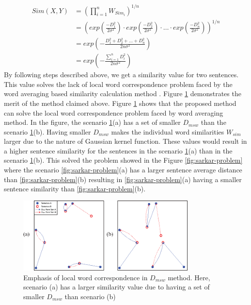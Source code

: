 \documentclass[acmlarge]{acmart}
\begin{document}
\begin{equation}\label{eq:sent_sim}
	\begin{split}
		Sim(X,Y)
		&=  \left(
			\prod_{i=1}^nW_{Sim_i}
		\right)^{1/n}\\
		&=  \left(
			exp\left(\frac{-D_1^2}{2\sigma^2}\right)\cdot
			exp\left(\frac{-D_2^2}{2\sigma^2}\right)\cdot
				\ldots \cdot
			exp\left(\frac{-D_n^2}{2\sigma^2}\right)
		\right)^{1/n}\\
		&=  exp\left(
			-\frac{D_1^2+D_2^2+\ldots+D_n^2}{2n\sigma^2}
			\right)\\
		&=  exp\left(
			-\frac{\sum_{i=1}^nD_i^2}{2n\sigma^2}
		\right)
	\end{split}
\end{equation}
By following steps described above, we get a similarity value for two sentences. This value solves the lack of local word correspondence problem faced by the word averaging based similarity calculation method \cite{roychowdhury-etal-2022-spectral-base}. Figure \ref{fig:msd} demonstrates the merit of the method claimed above. Figure \ref{fig:msd} 
shows that the proposed method can solve the local word correspondence problem faced by word averaging method. In the figure, the scenario \ref{fig:msd}(a) has a set of smaller $D_{msw}$ than the scenario \ref{fig:msd}(b). Having smaller $D_{msw}$ makes the individual word similarities $W_{sim}$ larger due to the nature of Gaussian kernel function. These values would result in a higher sentence similarity for the sentences in the scenario \ref{fig:msd}(a) than in the scenario \ref{fig:msd}(b). This solved the problem showed in the Figure \ref{fig:sarkar-problem} where the scenario \ref{fig:sarkar-problem}(a) has a larger sentence average distance than \ref{fig:sarkar-problem}(b) resulting in \ref{fig:sarkar-problem}(a) having a smaller sentence similarity than \ref{fig:sarkar-problem}(b).
\begin{figure}
	\centering
	\includegraphics[width=0.8\textwidth]{figs/msd-edited}
	\caption{Emphasis of local word correspondence in $D_{msw}$ method. Here, scenario (a) has a larger similarity value due to having a set of smaller $D_{msw}$ than scenario (b)}
	\label{fig:msd}
\end{figure}
\end{document}
